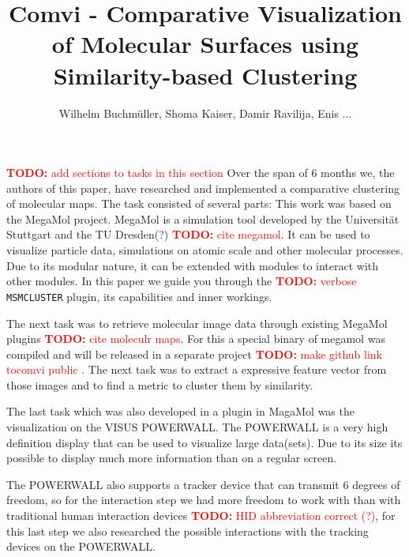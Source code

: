 \documentclass[journal]{vgtc}       %
\title{Comvi - Comparative Visualization of Molecular Surfaces using Similarity-based Clustering}
\author{Wilhelm Buchm\"uller, Shoma Kaiser, Damir Ravilija, Enis ...}
\newcommand{\todo}[1]{\textcolor{red}{\textbf{TODO:} #1}}
\begin{document}

\label{sec:intro}
%
\maketitle
%
\todo{add sections to tasks in this section}%
Over the span of 6 months we, the authors of this paper,  have researched and implemented a comparative clustering of molecular maps.
The task consisted of several parts: This work was based on the MegaMol project. MegaMol is a simulation tool developed by the Universität Stuttgart and the TU Dresden(?) \todo{cite megamol}\cite{MegaMol}. It can be used to visualize particle data, simulations on atomic scale and other molecular processes. 
Due to its modular nature, it can be extended with modules to interact with other modules.
In this paper we guide you through the \todo{verbose} \verb|MSMCLUSTER| plugin, its capabilities and inner workings.

The next task was to retrieve molecular image data through existing MegaMol plugins \todo{cite moleculr maps}\cite{molecularmaps}. For this a special binary of megamol was compiled and will be released in a separate project \todo{make github link tocomvi public }.
The next task was to extract a expressive feature vector from those images and to find a metric to cluster them by similarity.

The last task which was also developed in a plugin in MagaMol was the visualization on the VISUS POWERWALL. The POWERWALL is a very high definition display that can be used to visualize large data(sets). Due to its size its possible to display much more information than on a regular screen. 

The POWERWALL also supports a tracker device that can transmit 6 degrees of freedom, so for the interaction step we had more freedom to work with than with traditional human interaction devices  \todo{HID abbreviation correct (?)}, for this last step we also researched the possible interactions with the tracking devices on the POWERWALL.
\end{document}
